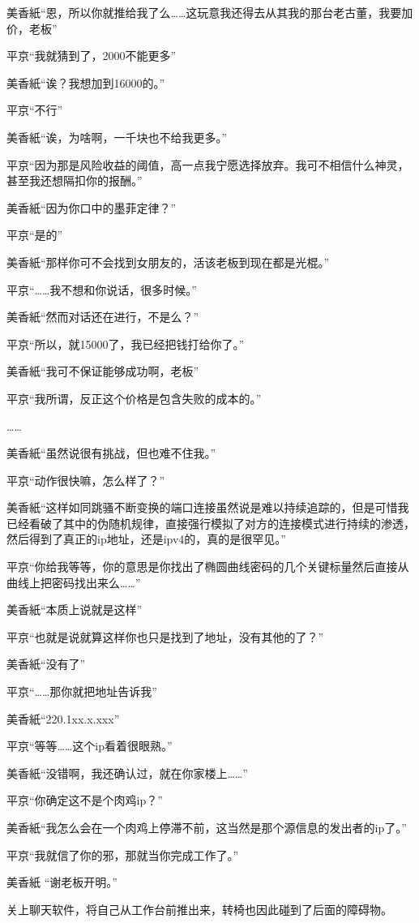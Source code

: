 美香紙“恩，所以你就推给我了么……这玩意我还得去从其我的那台老古董，我要加价，老板”

平京“我就猜到了，2000不能更多”

美香紙“诶？我想加到16000的。”

平京“不行”

美香紙“诶，为啥啊，一千块也不给我更多。”

平京“因为那是风险收益的阈值，高一点我宁愿选择放弃。我可不相信什么神灵，甚至我还想隔扣你的报酬。”

美香紙“因为你口中的墨菲定律？”

平京“是的”

美香紙“那样你可不会找到女朋友的，活该老板到现在都是光棍。”

平京“……我不想和你说话，很多时候。”

美香紙“然而对话还在进行，不是么？”

平京“所以，就15000了，我已经把钱打给你了。”

美香紙“我可不保证能够成功啊，老板”

平京“我所谓，反正这个价格是包含失败的成本的。”

……

美香紙“虽然说很有挑战，但也难不住我。”

平京“动作很快嘛，怎么样了？”

美香紙“这样如同跳骚不断变换的端口连接虽然说是难以持续追踪的，但是可惜我已经看破了其中的伪随机规律，直接强行模拟了对方的连接模式进行持续的渗透，然后得到了真正的ip地址，还是ipv4的，真的是很罕见。”

平京“你给我等等，你的意思是你找出了椭圆曲线密码的几个关键标量然后直接从曲线上把密码找出来么……”

美香紙“本质上说就是这样”

平京“也就是说就算这样你也只是找到了地址，没有其他的了？”

美香紙“没有了”

平京“……那你就把地址告诉我”

美香紙“220.1xx.x.xxx”

平京“等等……这个ip看着很眼熟。”

美香紙“没错啊，我还确认过，就在你家楼上……”

平京“你确定这不是个肉鸡ip？”

美香紙“我怎么会在一个肉鸡上停滞不前，这当然是那个源信息的发出者的ip了。”

平京“我就信了你的邪，那就当你完成工作了。”

美香紙 “谢老板开明。”

关上聊天软件，将自己从工作台前推出来，转椅也因此碰到了后面的障碍物。
